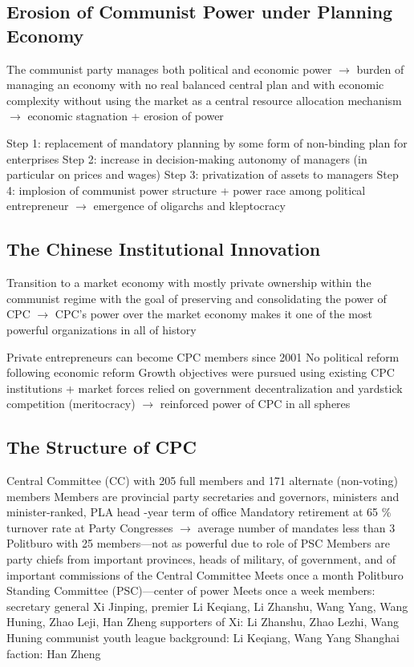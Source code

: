 \documentclass[11pt]{article}
\theoremstyle{definition}
\theoremstyle{remark}
\begin{document}
\subsection{Erosion of Communist Power under Planning Economy}
The communist party manages both political and economic power $\to$ burden of managing an economy with no real balanced central plan and with economic complexity without using the market as a central resource allocation mechanism $\to$ economic stagnation + erosion of power
\begin{outline}[enumerate]
\1 Step 1: replacement of mandatory planning by some form of non-binding plan for enterprises
\1 Step 2: increase in decision-making autonomy of managers (in particular on prices and wages)
\1 Step 3: privatization of assets to managers
\1 Step 4: implosion of communist power structure + power race among political entrepreneur $\to$ emergence of oligarchs and kleptocracy
\end{outline}

\subsection{The Chinese Institutional Innovation}
Transition to a market economy with mostly private ownership within the communist regime with the goal of preserving and consolidating the power of CPC $\to$ CPC's power over the market economy makes it one of the most powerful organizations in all of history
\begin{outline}[enumerate]
\1 Private entrepreneurs can become CPC members since 2001
\1 No political reform following economic reform
\1 Growth objectives were pursued using existing CPC institutions + market forces relied on government decentralization and yardstick competition (meritocracy) $\to$ reinforced power of CPC in all spheres
\end{outline}

\subsection{The Structure of CPC}
\begin{outline}[enumerate]
\1 Central Committee (CC) with 205 full members and 171 alternate (non-voting) members
	\2 Members are provincial party secretaries and governors, ministers and minister-ranked, PLA head
	-year term of office
	\2 Mandatory retirement at 65
	\% turnover rate at Party Congresses $\to$ average number of mandates less than 3
\1 Politburo with 25 members---not as powerful due to role of PSC
	\2 Members are party chiefs from important provinces, heads of military, of government, and of important commissions of the Central Committee
	\2 Meets once a month
\1 Politburo Standing Committee (PSC)---center of power
	\2 Meets once a week
	 members: secretary general Xi Jinping, premier Li Keqiang, Li Zhanshu, Wang Yang, Wang Huning, Zhao Leji, Han Zheng
		 supporters of Xi: Li Zhanshu, Zhao Lezhi, Wang Huning
		 communist youth league background: Li Keqiang, Wang Yang
		 Shanghai faction: Han Zheng
\end{outline}
\end{document}
